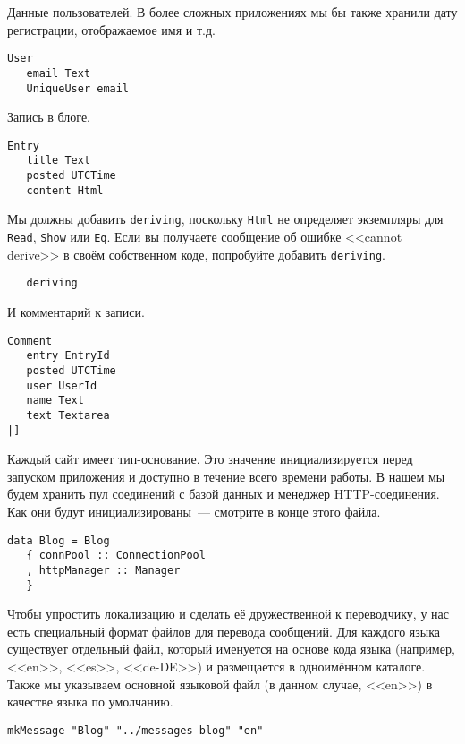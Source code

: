 Данные пользователей. В более сложных приложениях мы бы также хранили дату регистрации, отображаемое имя и т.д.
 
\begin{lstlisting}
User
   email Text
   UniqueUser email
\end{lstlisting}
 
Запись в блоге. 
 
\begin{lstlisting}
Entry
   title Text
   posted UTCTime
   content Html
\end{lstlisting}
 
Мы должны добавить \lstinline!deriving!, поскольку \lstinline!Html! не определяет экземпляры для \lstinline!Read!, \lstinline!Show! или \lstinline!Eq!. Если вы получаете сообщение об ошибке <<cannot derive>> в своём собственном коде, попробуйте добавить \lstinline!deriving!.
 
\begin{lstlisting}
   deriving
\end{lstlisting}
 
И комментарий к записи.
 
\begin{lstlisting}
Comment
   entry EntryId
   posted UTCTime
   user UserId
   name Text
   text Textarea
|]
\end{lstlisting}
 
Каждый сайт имеет тип-основание. Это значение инициализируется перед запуском приложения и доступно в течение всего времени работы. В нашем мы будем хранить пул соединений с базой данных и менеджер HTTP-соединения. Как они будут инициализированы~--- смотрите в конце этого файла.
 
\begin{lstlisting}
data Blog = Blog
   { connPool :: ConnectionPool
   , httpManager :: Manager
   }
\end{lstlisting}
 
Чтобы упростить локализацию и сделать её дружественной к переводчику, у нас есть специальный формат файлов для перевода сообщений. Для каждого языка существует отдельный файл, который именуется на основе кода языка (например, <<en>>, <<es>>, <<de-DE>>) и размещается в одноимённом каталоге. Также мы указываем основной языковой файл (в данном случае, <<en>>) в качестве языка по умолчанию.
 
\begin{lstlisting}
mkMessage "Blog" "../messages-blog" "en"
\end{lstlisting}
 
